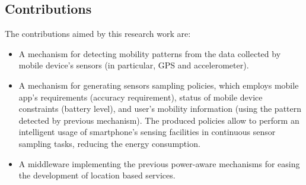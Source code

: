 \documentclass[ENG,PhD]{cinvestav}
\begin{document}
\subsection{Contributions}
The contributions aimed by this research work are:
\begin{itemize}
  \item A mechanism for detecting mobility patterns from the data collected by mobile device's sensors (in particular, GPS and accelerometer).
  \item A mechanism for generating sensors sampling policies, which employs mobile app's requirements (accuracy requirement), status of mobile device constraints (battery level), and user's mobility information (using the pattern detected by previous mechanism).
  The produced policies allow to perform an intelligent usage of smartphone's sensing facilities in continuous sensor sampling tasks, reducing the energy consumption.
  \item A middleware implementing the previous power-aware mechanisms for easing the development of location based services.
\end{itemize}
\end{document}
